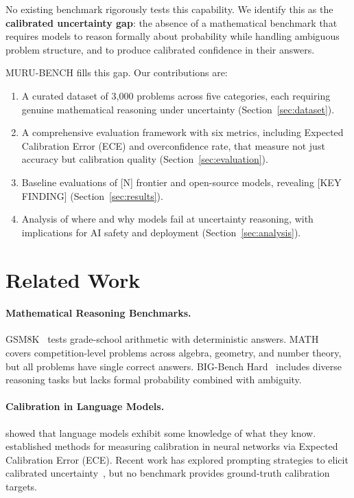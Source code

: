 \documentclass{article}
\begin{document}
No existing benchmark rigorously tests this capability. We identify this as the \textbf{calibrated uncertainty gap}: the absence of a mathematical benchmark that requires models to reason formally about probability while handling ambiguous problem structure, and to produce calibrated confidence in their answers.

MURU-BENCH fills this gap. Our contributions are:

\begin{enumerate}
    \item A curated dataset of 3{,}000 problems across five categories, each requiring genuine mathematical reasoning under uncertainty (Section~\ref{sec:dataset}).
    \item A comprehensive evaluation framework with six metrics, including Expected Calibration Error (ECE) and overconfidence rate, that measure not just accuracy but calibration quality (Section~\ref{sec:evaluation}).
    \item Baseline evaluations of [N] frontier and open-source models, revealing [KEY FINDING] (Section~\ref{sec:results}).
    \item Analysis of where and why models fail at uncertainty reasoning, with implications for AI safety and deployment (Section~\ref{sec:analysis}).
\end{enumerate}


\section{Related Work}
\label{sec:related}

\paragraph{Mathematical Reasoning Benchmarks.}
GSM8K~\citep{gsm8k} tests grade-school arithmetic with deterministic answers. MATH~\citep{math} covers competition-level problems across algebra, geometry, and number theory, but all problems have single correct answers. BIG-Bench Hard~\citep{bigbench} includes diverse reasoning tasks but lacks formal probability combined with ambiguity.

\paragraph{Calibration in Language Models.}
\citet{kadavath2022} showed that language models exhibit some knowledge of what they know. \citet{guo2017} established methods for measuring calibration in neural networks via Expected Calibration Error (ECE). Recent work has explored prompting strategies to elicit calibrated uncertainty~\citep{tian2023}, but no benchmark provides ground-truth calibration targets.
\end{document}
